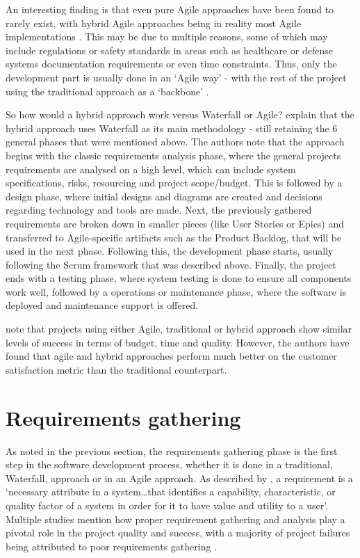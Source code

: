 An interesting finding is that even pure Agile approaches have been found to rarely exist, with hybrid Agile approaches being in reality most Agile implementations \parencite{hybrid1}. This may be due to multiple reasons, some of which may include regulations or safety standards in areas such as healthcare or defense systems documentation requirements or even time constraints. Thus, only the development part is usually done in an `Agile way' - with the rest of the project using the traditional approach as a `backbone' \parencite{hybrid2}.

So how would a hybrid approach work versus Waterfall or Agile? \textcite{hybrid2} explain that the hybrid approach uses Waterfall as its main methodology - still retaining the 6 general phases that were mentioned above. The authors note that the approach begins with the classic requirements analysis phase, where the general projects requirements are analysed on a high level, which can include system specifications, risks, resourcing and project scope/budget. This is followed by a design phase, where initial designs and diagrams are created and decisions regarding technology and tools are made. Next, the previously gathered requirements are broken down in smaller pieces (like User Stories or Epics) and transferred to Agile-specific artifacts such as the Product Backlog, that will be used in the next phase. Following this, the development phase starts, usually following the Scrum framework that was described above. Finally, the project ends with a testing phase, where system testing is done to ensure all components work well, followed by a operations or maintenance phase, where the software is deployed and maintenance support is offered.

\textcite{hybrid1} note that projects using either Agile, traditional or hybrid approach show similar levels of success in terms of budget, time and quality. However, the authors have found that agile and hybrid approaches perform much better on the customer satisfaction metric than the traditional counterpart.

\section{Requirements gathering}

As noted in the previous section, the requirements gathering phase is the first step in the software development process, whether it is done in a traditional, Waterfall, approach or in an Agile approach. As described by \textcite{reqanalysis2}, a requirement is a `necessary attribute in a system\ldots that identifies a capability, characteristic, or quality factor of a system in order for it to have value and utility to a user'. Multiple studies mention how proper requirement gathering and analysis play a pivotal role in the project quality and success, with a majority of project failures being attributed to poor requirements gathering \parencite{reqanalysis1, reqanalysis3, reqanalysis5}.

